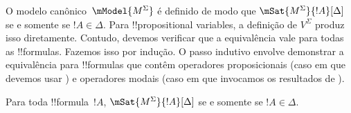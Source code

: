 \documentclass[../../../include/open-logic-section]{subfiles}
\begin{document}


O modelo canônico~$\mModel{M^\Sigma}$ é definido de modo que
$\mSat{M^\Sigma}{!A}[\Delta]$ se e somente se $!A \in \Delta$. Para
!!{propositional
variable}s, a definição de $V^\Sigma$ produz isso
diretamente. Contudo, devemos verificar que a equivalência vale para
todas as !!{formula}s. Fazemos isso por indução. O passo indutivo
envolve demonstrar a equivalência para !!{formula}s que contêm
operadores proposicionais (caso em que devemos usar
) e operadores modais (caso em que
invocamos os resultados de ).

\begin{prop}
  Para toda !!{formula}~$!A$, $\mSat{M^\Sigma}{!A}[\Delta]$ se e somente se
  $!A \in \Delta$.
\end{prop}
\end{document}
